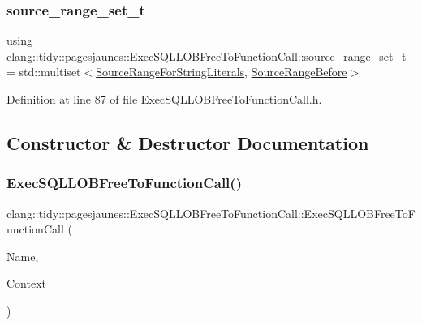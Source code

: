 \subsubsection{\texorpdfstring{source\+\_\+range\+\_\+set\+\_\+t}{source\_range\_set\_t}}
{\footnotesize\ttfamily using \hyperlink{classclang_1_1tidy_1_1pagesjaunes_1_1_exec_s_q_l_l_o_b_free_to_function_call_a315d9200c75931dbd556e1280b5c8763}{clang\+::tidy\+::pagesjaunes\+::\+Exec\+S\+Q\+L\+L\+O\+B\+Free\+To\+Function\+Call\+::source\+\_\+range\+\_\+set\+\_\+t} =  std\+::multiset$<$\hyperlink{classclang_1_1tidy_1_1pagesjaunes_1_1_exec_s_q_l_l_o_b_free_to_function_call_1_1_source_range_for_string_literals}{Source\+Range\+For\+String\+Literals}, \hyperlink{classclang_1_1tidy_1_1pagesjaunes_1_1_exec_s_q_l_l_o_b_free_to_function_call_1_1_source_range_before}{Source\+Range\+Before}$>$}



Definition at line 87 of file Exec\+S\+Q\+L\+L\+O\+B\+Free\+To\+Function\+Call.\+h.



\subsection{Constructor \& Destructor Documentation}
\mbox{\label{classclang_1_1tidy_1_1pagesjaunes_1_1_exec_s_q_l_l_o_b_free_to_function_call_a191d57a9b724f7d5baa73b2a2ca30189}} 
\subsubsection{\texorpdfstring{Exec\+S\+Q\+L\+L\+O\+B\+Free\+To\+Function\+Call()}{ExecSQLLOBFreeToFunctionCall()}}
{\footnotesize\ttfamily clang\+::tidy\+::pagesjaunes\+::\+Exec\+S\+Q\+L\+L\+O\+B\+Free\+To\+Function\+Call\+::\+Exec\+S\+Q\+L\+L\+O\+B\+Free\+To\+Function\+Call (\begin{DoxyParamCaption}\item[{String\+Ref}]{Name,  }\item[{Clang\+Tidy\+Context $\ast$}]{Context }\end{DoxyParamCaption})}



